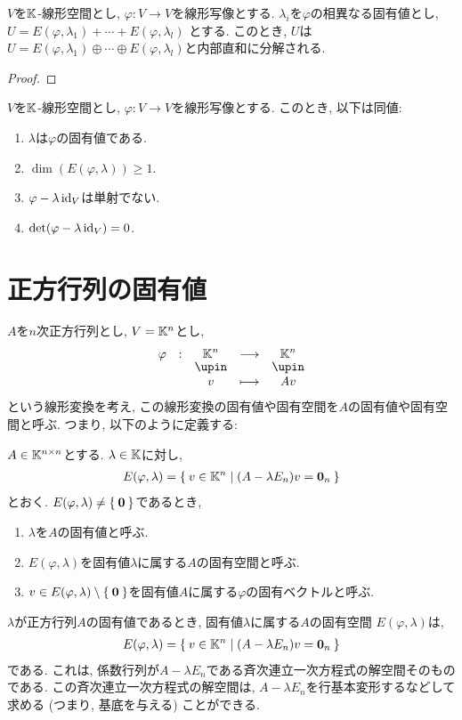 \begin{cor}
  $V$を$\mathbb{K}$-線形空間とし,
  $\varphi\colon V\to V$を線形写像とする.
  $\lambda_i$を$\varphi$の相異なる固有値とし,
  $U=E(\varphi,\lambda_1)+\cdots +E(\varphi,\lambda_{l})$
  とする.
  このとき, $U$は$U=E(\varphi,\lambda_1)\oplus \cdots \oplus E(\varphi,\lambda_{l})$と内部直和に分解される.
\end{cor}
\begin{proof}\end{proof}

\begin{prop}
  $V$を$\mathbb{K}$-線形空間とし,
  $\varphi\colon V\to V$を線形写像とする.
  このとき, 以下は同値:
  \begin{enumerate}
  \item $\lambda$は$\varphi$の固有値である.
  \item $\dim(E(\varphi,\lambda))\geq 1$.
  \item $\varphi-\lambda\operatorname{id}_V$は単射でない.
  \item $\det(\varphi-\lambda\operatorname{id}_V)=0$.    
  \end{enumerate}
\end{prop}

\section{正方行列の固有値}
$A$を$n$次正方行列とし,
$V=\mathbb{K}^n$とし,
\begin{align*}
  \shazo{\varphi}{\KK^n}{\KK^n}
  {v}{Av}
\end{align*}
という線形変換を考え,
この線形変換の固有値や固有空間を$A$の固有値や固有空間と呼ぶ.
つまり, 以下のように定義する:
\begin{definition}
  $A\in\mathbb{K}^{n\times n}$とする.
  $\lambda \in \mathbb{K}$に対し,
  \begin{align*}
    E(\varphi,\lambda) = \Set{v\in\mathbb{K}^n|(A-\lambda E_n)v=\boldsymbol{0}_n}
  \end{align*}
  とおく.
  $E(\varphi,\lambda)\neq \Set{\boldsymbol{0}}$であるとき,
  \begin{enumerate}
  \item $\lambda$を$A$の固有値と呼ぶ.
  \item $E(\varphi,\lambda)$を固有値$\lambda$に属する$A$の固有空間と呼ぶ.
  \item $v\in E(\varphi,\lambda)\setminus\Set{\boldsymbol{0}}$を固有値$A$に属する$\varphi$の固有ベクトルと呼ぶ.
  \end{enumerate}
\end{definition}
$\lambda$が正方行列$A$の固有値であるとき,
固有値$\lambda$に属する$A$の固有空間
$E(\varphi,\lambda)$は,
\begin{align*}
    E(\varphi,\lambda) = \Set{v\in\mathbb{K}^n|(A-\lambda E_n)v=\boldsymbol{0}_n}
\end{align*}
である.
これは,
係数行列が$A-\lambda E_n$である斉次連立一次方程式の解空間そのものである.
この斉次連立一次方程式の解空間は,
$A-\lambda E_n$を行基本変形するなどして求める
(つまり, 基底を与える) ことができる.

